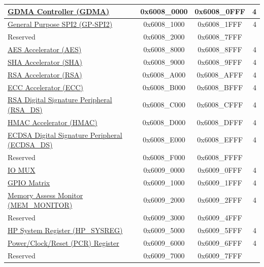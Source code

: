 \begin{ThreePartTable}
\begin{longtable}[c]{ |p{7cm}|c|c|r| }
\hyperref[mod:dma]{GDMA Controller (GDMA)}& 0x6008\_0000 & 0x6008\_0FFF &   4     \\\hline
\hyperref[mod:spi]{General Purpose SPI2 (GP-SPI2)}& 0x6008\_1000 & 0x6008\_1FFF &   4     \\\hline
    \rowcolor{gray!25}  Reserved                    & 0x6008\_2000 & 0x6008\_7FFF &         \\\hline
\hyperref[mod:aes]{AES Accelerator (AES)}& 0x6008\_8000 & 0x6008\_8FFF &   4     \\\hline
\hyperref[mod:sha]{SHA Accelerator (SHA)} & 0x6008\_9000 & 0x6008\_9FFF &   4     \\\hline
\hyperref[mod:rsa]{RSA Accelerator (RSA)}& 0x6008\_A000 & 0x6008\_AFFF &   4     \\\hline
\hyperref[mod:ecc]{ECC Accelerator (ECC)} & 0x6008\_B000 & 0x6008\_BFFF &   4     \\\hline
\hyperref[mod:digsig]{RSA Digital Signature Peripheral (RSA\_DS)} & 0x6008\_C000 & 0x6008\_CFFF &   4     \\\hline
\hyperref[mod:hmac]{HMAC Accelerator (HMAC)}& 0x6008\_D000 & 0x6008\_DFFF &   4     \\\hline
\hyperref[mod:ecdsa]{ECDSA Digital Signature Peripheral (ECDSA\_DS)}& 0x6008\_E000 & 0x6008\_EFFF &   4     \\\hline
    \rowcolor{gray!25}  Reserved                    & 0x6008\_F000 & 0x6008\_FFFF &         \\\hline
\hyperref[mod:iomuxgpio]{IO MUX}                      & 0x6009\_0000 & 0x6009\_0FFF &   4     \\\hline
\hyperref[mod:iomuxgpio]{GPIO Matrix}& 0x6009\_1000 & 0x6009\_1FFF &   4     \\\hline
\hyperref[mod:dbgassist]{Memory Assess Monitor (MEM\_MONITOR)}\tnote{\textcolor{red}{*}}                & 0x6009\_2000 & 0x6009\_2FFF &   4   \\\hline
    \rowcolor{gray!25}  Reserved                    & 0x6009\_3000 & 0x6009\_4FFF &         \\\hline
\hyperref[mod:sysreg]{HP System Register (HP\_SYSREG)}       & 0x6009\_5000 & 0x6009\_5FFF &   4     \\\hline
\hyperref[mod:resclk]{Power/Clock/Reset (PCR) Register}                     & 0x6009\_6000 & 0x6009\_6FFF &   4     \\\hline %
    \rowcolor{gray!25}  Reserved                    & 0x6009\_7000 & 0x6009\_7FFF &         \\\hline

\end{longtable}
\end{ThreePartTable}

